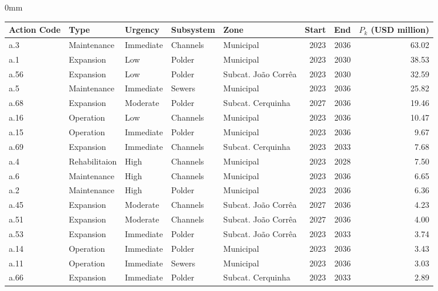 \documentclass[./main.tex]{subfiles}
\begin{document}
\begin{adjustwidth}{\bodytab}{0mm}
\begin{table}[t]
    \centering
    \tiny
\begin{tabular}{lllllrrr}
\toprule
\textbf{Action Code} &          \textbf{Type}&   \textbf{Urgency} &   \textbf{Subsystem} &                \textbf{Zone} &  \textbf{Start} &  \textbf{End} &    \textbf{$P_k$ (USD million)} \\
\midrule
 a.3 &   Maintenance & Immediate & Channels &           Municipal &   2023 & 2036 & 63.02 \\
 a.1 &     Expansion &       Low &   Polder &           Municipal &   2023 & 2030 & 38.53 \\
a.56 &     Expansion &       Low &   Polder & Subcat. João Corrêa &   2023 & 2030 & 32.59 \\
 a.5 &   Maintenance & Immediate &   Sewers &           Municipal &   2023 & 2036 & 25.82 \\
a.68 &     Expansion &  Moderate &   Polder &   Subcat. Cerquinha &   2027 & 2036 & 19.46 \\
a.16 &     Operation &       Low & Channels &           Municipal &   2023 & 2036 & 10.47 \\
a.15 &     Operation & Immediate &   Polder &           Municipal &   2023 & 2036 &  9.67 \\
a.69 &     Expansion & Immediate & Channels &   Subcat. Cerquinha &   2023 & 2033 &  7.68 \\
 a.4 & Rehabilitaion &      High & Channels &           Municipal &   2023 & 2028 &  7.50 \\
 a.6 &   Maintenance &      High & Channels &           Municipal &   2023 & 2036 &  6.65 \\
 a.2 &   Maintenance &      High &   Polder &           Municipal &   2023 & 2036 &  6.36 \\
a.45 &     Expansion &  Moderate & Channels & Subcat. João Corrêa &   2027 & 2036 &  4.23 \\
a.51 &     Expansion &  Moderate & Channels & Subcat. João Corrêa &   2027 & 2036 &  4.00 \\
a.53 &     Expansion & Immediate &   Polder & Subcat. João Corrêa &   2023 & 2033 &  3.74 \\
a.14 &     Operation & Immediate &   Polder &           Municipal &   2023 & 2036 &  3.43 \\
a.11 &     Operation & Immediate &   Sewers &           Municipal &   2023 & 2036 &  3.03 \\
a.66 &     Expansion & Immediate &   Polder &   Subcat. Cerquinha &   2023 & 2033 &  2.89 \\

\end{tabular}
\end{table}
\end{adjustwidth}
\end{document}

